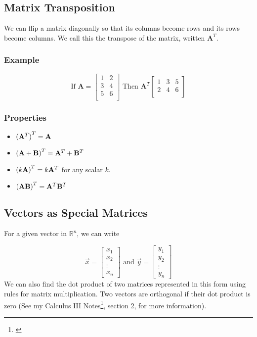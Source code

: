     \subsection{Matrix Transposition}
    We can flip a matrix diagonally so that its columns become rows and its rows become columns. We call this the transpose of the matrix, written $\mathbf{A}^T$.

        \subsubsection{Example}
        \[
        \text{If } \mathbf{A} = \left[ \begin{array}{cc}
            1 & 2\\
            3 & 4\\
            5 & 6\\
        \end{array} \right] \text{ Then } \mathbf{A}^T
        \left[ \begin{array}{ccc}
            1 & 3 & 5\\
            2 & 4 & 6\\
        \end{array} \right]
        \]

        \subsubsection{Properties}
        \begin{itemize}
            \item ${(\mathbf{A}^T)}^T = \mathbf{A}$
            \item ${(\mathbf{A} + \mathbf{B})}^T = \mathbf{A}^T + \mathbf{B}^T$
            \item ${(k \mathbf{A})}^T = k\mathbf{A}^T$ for any scalar $k$.
            \item ${(\mathbf{A} \mathbf{B})}^T = \mathbf{A}^T \mathbf{B}^T$
        \end{itemize}

    \subsection{Vectors as Special Matrices}
    For a given vector in $\mathbb{R}^n$, we can write

    \[
        \vec{x} =
        \left[\begin{matrix}
        x_1\\
        x_2\\
        \vdots\\
        x_n
        \end{matrix}\right] \text{ and }
        \vec{y} =
        \left[\begin{matrix}
        y_1\\
        y_2\\
        \vdots\\
        y_n
        \end{matrix}\right]
    \]
    We can also find the dot product of two matrices represented in this form using rules for matrix multiplication. Two vectors are orthogonal if their dot product is zero (See my Calculus III Notes\footnote{\label{doc:calcIII} }, section 2, for more information).

